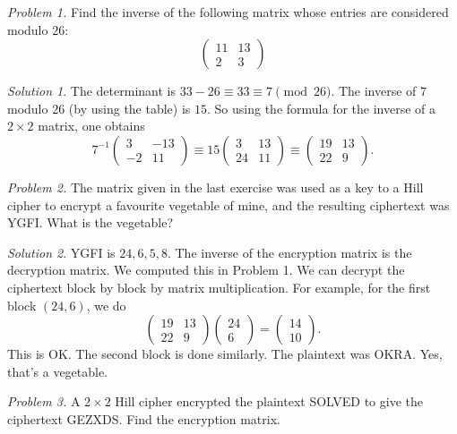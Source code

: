 \documentclass{article}
\theoremstyle{plain}
\theoremstyle{definition}
\theoremstyle{remark}
\newtheorem*{solution}{Solution}
\numberwithin{theorem}{section}
\begin{document}
\emph{Problem 1.}
Find the inverse of the following matrix whose entries are considered modulo $26$:
\[
	\begin{pmatrix} 11 & 13 \\ 2 & 3 \end{pmatrix}
\]


\begin{solution}
The determinant is $33 - 26 \equiv 33 \equiv 7 \pmod{26}$.  The inverse of $7$ modulo $26$ (by using the table) is $15$.  So using the formula for the inverse of a $2 \times 2$ matrix, one obtains
\[
	7^{-1}
	\begin{pmatrix}
	3 & -13 \\ -2 & 11
	\end{pmatrix}
	\equiv
	15	
	\begin{pmatrix}
		3 & 13 \\ 24 & 11
	\end{pmatrix}
	\equiv
	\begin{pmatrix}
		19 & 13 \\ 22 & 9
	\end{pmatrix}.
\]
\end{solution}

\emph{Problem 2.}
The matrix given in the last exercise was used as a key to a Hill cipher to encrypt a favourite vegetable of mine, and the resulting ciphertext was YGFI.  What is the vegetable?

\begin{solution}
YGFI is $24, 6, 5, 8$.  The inverse of the encryption matrix is the decryption matrix.  We computed this in Problem 1.  We can decrypt the ciphertext block by block by matrix multiplication.  For example, for the first block $(24, 6)$, we do 
\[
	\begin{pmatrix}
		19 & 13 \\ 22 & 9
	\end{pmatrix}
	\begin{pmatrix}
		24 \\ 6 
	\end{pmatrix}
	= 
	\begin{pmatrix}
		14 \\ 10
	\end{pmatrix}.
\]
This is OK.  The second block is done similarly. The plaintext was OKRA.  Yes, that's a vegetable.
\end{solution}


\emph{Problem 3.}
A $2 \times 2$ Hill cipher encrypted the plaintext SOLVED to give the ciphertext GEZXDS.  Find the encryption matrix.
\end{document}
